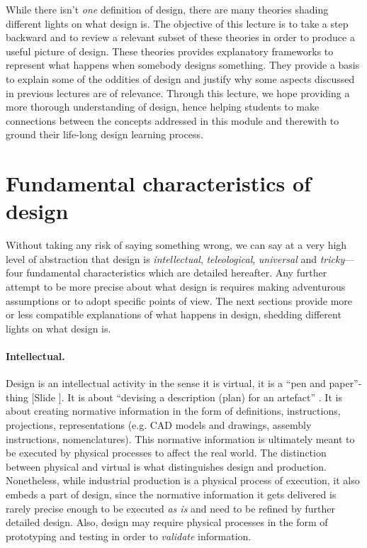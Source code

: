 \documentclass{article}
\newcounter{slide}
\begin{document}
While there isn't \emph{one} definition of design, there are many theories shading different lights on what design is. The objective of this lecture is to take a step backward and to review a relevant subset of these theories in order to produce a useful picture of design. These theories provides explanatory frameworks to represent what happens when somebody designs something. They provide a basis to explain some of the oddities of design and justify why some aspects discussed in previous lectures are of relevance. Through this lecture, we hope providing a more thorough understanding of design, hence helping students to make connections between the concepts addressed in this module and therewith to ground their life-long design learning process.

\section{Fundamental characteristics of design}
\label{sec:whatisdesign}

Without taking any risk of saying something wrong, we can say at a very high level of abstraction that design is \emph{intellectual}, \emph{teleological}, \emph{universal} and \emph{tricky}---four fundamental characteristics which are detailed hereafter. Any further attempt to be more precise about what design is requires making adventurous assumptions or to adopt specific points of view. The next sections provide more or less compatible explanations of what happens in design, shedding different lights on what design is. 

\paragraph{Intellectual.} Design is an intellectual activity in the sense it is virtual, it is a ``pen and paper''-thing {\color{blue}[Slide ]}. It is about ``devising a description (plan) for an artefact'' \cite{hybsEvolutionaryProcessModel1992}. It is about creating normative information in the form of definitions, instructions, projections, representations (e.g. CAD models and drawings, assembly instructions, nomenclatures). This normative information is ultimately meant to be executed by physical processes to affect the real world. The distinction between physical and virtual is what distinguishes design and production. Nonetheless, while industrial production is a physical process of execution, it also embeds a part of design, since the normative information it gets delivered is rarely precise enough to be executed \emph{as is} and need to be refined by further detailed design. Also, design may require physical processes in the form of prototyping and testing in order to \emph{validate} information.
\end{document}
